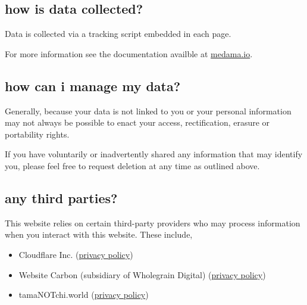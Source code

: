 \documentclass{article}
\begin{document}
\subsection{how is data collected?}
Data is collected via a tracking script embedded in each page.

For more information see the documentation availble at \href{https://medama.io}{medama.io}.

\subsection{how can i manage my data?}
Generally, because your data is not linked to you or your personal information may not always be possible to enact your access, rectification,
 erasure or portability rights.

If you have voluntarily or inadvertently shared any information that may identify you, please feel free to 
request deletion at any time as outlined above.

\subsection{any third parties?}
This website relies on certain third-party providers who may process information when you interact with this website. These include,
\begin{itemize}
\item Cloudflare Inc. (\href{https://www.cloudflare.com/policies/privacy/}{privacy policy})
\item Website Carbon (subsidiary of Wholegrain Digital) (\href{https://www.websitecarbon.com/privacy-policy/}{privacy policy})
\item tamaNOTchi.world (\href{https://tamanotchi.world/privacy/}{privacy policy})
\end{itemize}

\end{document}
